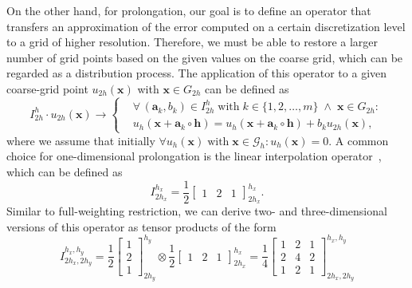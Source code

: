 On the other hand, for prolongation, our goal is to define an operator that transfers an approximation of the error computed on a certain discretization level to a grid of higher resolution.
Therefore, we must be able to restore a larger number of grid points based on the given values on the coarse grid, which can be regarded as a distribution process.
The application of this operator to a given coarse-grid point $u_{2h}(\bm{x})$ with $\bm{x} \in G_{2h}$ can be defined as
\begin{equation}
	I_{2h}^{h} \cdot u_{2h}(\bm{x}) \rightarrow
	\begin{cases}
		& \forall \, (\bm{a}_k, b_k) \in I_{2h}^{h} \; \text{with} \; k \in \{ 1, 2, \dots, m \} \; \wedge \; \bm{x} \in G_{2h} : \\
		& u_{h}(\bm{x} + \bm{a}_k \circ \bm{h}) = u_{h}(\bm{x} + \bm{a}_k \circ \bm{h}) + b_k u_{2h}(\bm{x}), 
	\end{cases}
	\label{eq:stencil-prolongation application}
\end{equation}
where we assume that initially $\forall u_h(\bm{x}) \; \text{with} \; \bm{x} \in \mathcal G_h : u_h(\bm{x}) = 0$.
A common choice for one-dimensional prolongation is the linear interpolation operator~\cite{trottenberg2000multigrid}, which can be defined as
\begin{equation}
	I_{2h_x}^{h_x} =  \frac{1}{2} \begin{bmatrix}
		1 & 2 & 1
	\end{bmatrix}_{2h_x}^{h_x}.
	\label{eq:linear-interpolation}
\end{equation}
Similar to full-weighting restriction, we can derive two- and three-dimensional versions of this operator as tensor products of the form
\begin{equation}
	I_{2h_x, 2h_y}^{h_x, h_y} = \frac{1}{2} \begin{bmatrix}
		1 \\ 2 \\ 1
	\end{bmatrix}_{2h_y}^{h_y} \otimes \frac{1}{2} \begin{bmatrix}
		1 & 2 & 1
	\end{bmatrix}_{2h_x}^{h_x} =
	\frac{1}{4} 
	\begin{bmatrix}
		1 & 2 & 1 \\
		2 & 4 & 2 \\
		1 & 2 & 1
	\end{bmatrix}_{2h_x, 2h_y}^{h_x, h_y}
\end{equation}
